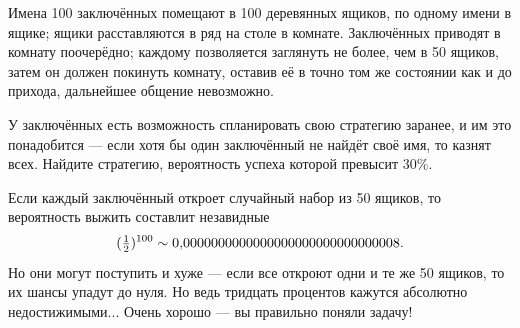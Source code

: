 Имена 100 заключённых помещают в 100 деревянных ящиков, по одному имени в ящике;
ящики расставляются в ряд на столе в комнате.
Заключённых приводят в комнату поочерёдно;
каждому позволяется заглянуть не более, чем в 50 ящиков,
затем он должен покинуть комнату, оставив её в точно том же состоянии как и до прихода,
дальнейшее общение невозможно.

У заключённых есть возможность спланировать свою стратегию заранее, и им это понадобится --- если хотя бы один заключённый не найдёт своё имя, то казнят всех.
Найдите стратегию, вероятность успеха которой превысит 30\%.

 Если каждый заключённый откроет случайный набор из 50 ящиков, то вероятность выжить составлит незавидные
\[(\tfrac12)^{100}\z\sim 0{,}0000000000000000000000000000008.\]
Но они могут поступить и хуже --- если все откроют одни и те же 50 ящиков, то их шансы упадут до нуля.
Но ведь тридцать процентов кажутся абсолютно недостижимыми...
Очень хорошо --- вы правильно поняли задачу!
